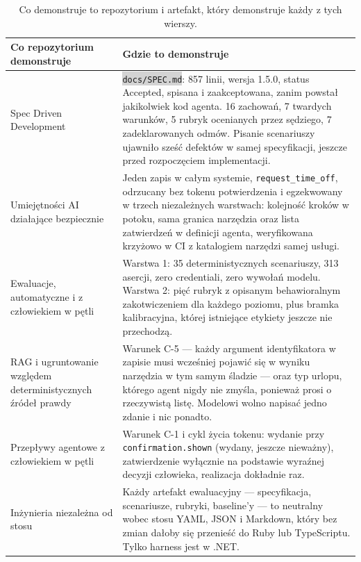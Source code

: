 \documentclass[11pt,a4paper]{article}
\newcommand{\repopath}[1]{\colorbox{lightgray}{\texttt{#1}}}
\begin{document}
\begin{table}[htbp]
\centering
\small
\begin{tabularx}{\linewidth}{@{}>{\raggedright\arraybackslash}p{4.6cm}X@{}}
\toprule
\textbf{Co repozytorium demonstruje} & \textbf{Gdzie to demonstruje} \\
\midrule
Spec Driven Development &
\repopath{docs/SPEC.md}: 857 linii, wersja 1.5.0, status Accepted, spisana i
zaakceptowana, zanim powstał jakikolwiek kod agenta. 16 zachowań, 7 twardych
warunków, 5 rubryk ocenianych przez sędziego, 7 zadeklarowanych odmów. Pisanie
scenariuszy
ujawniło sześć defektów w samej specyfikacji, jeszcze przed rozpoczęciem
implementacji. \\
\addlinespace
Umiejętności AI działające bezpiecznie &
Jeden zapis w całym systemie, \texttt{request\_time\_off}, odrzucany bez tokenu
potwierdzenia i egzekwowany w trzech niezależnych warstwach: kolejność kroków w
potoku, sama granica narzędzia oraz lista zatwierdzeń w definicji agenta,
weryfikowana krzyżowo w CI z katalogiem narzędzi samej usługi. \\
\addlinespace
Ewaluacje, automatyczne i z człowiekiem w pętli &
Warstwa 1: 35 deterministycznych scenariuszy, 313 asercji, zero credentiali,
zero wywołań modelu. Warstwa 2: pięć rubryk z opisanym behawioralnym
zakotwiczeniem dla każdego poziomu, plus bramka kalibracyjna, której istniejące
etykiety jeszcze nie przechodzą. \\
\addlinespace
RAG i ugruntowanie względem deterministycznych źródeł prawdy &
Warunek C-5 --- każdy argument identyfikatora w zapisie musi wcześniej pojawić
się w wyniku narzędzia w tym samym śladzie --- oraz typ urlopu, którego agent
nigdy nie zmyśla, ponieważ prosi o rzeczywistą listę. Modelowi wolno napisać
jedno zdanie i nic ponadto. \\
\addlinespace
Przepływy agentowe z człowiekiem w pętli &
Warunek C-1 i cykl życia tokenu: wydanie przy \texttt{confirmation.shown}
(wydany, jeszcze nieważny), zatwierdzenie wyłącznie na podstawie wyraźnej
decyzji człowieka, realizacja dokładnie raz. \\
\addlinespace
Inżynieria niezależna od stosu &
Każdy artefakt ewaluacyjny --- specyfikacja, scenariusze, rubryki, baseline'y
--- to neutralny wobec stosu YAML, JSON i Markdown, który bez zmian dałoby się
przenieść do Ruby lub TypeScriptu. Tylko harness jest w .NET. \\
\bottomrule
\end{tabularx}
\caption{Co demonstruje to repozytorium i artefakt, który demonstruje
każdy z tych wierszy.}
\label{tab:capmap}
\end{table}
\end{document}
